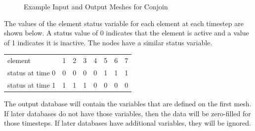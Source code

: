 \begin{figure}[htp]
\caption{Example Input and Output Meshes for Conjoin}
\end{figure}

The values of the element status variable for each element at each
timestep are shown below.  A status value of 0 indicates that the
element is active and a value of 1 indicates it is inactive. The nodes
have a similar status variable.

\begin{tabular}{l|ccccccc}
\hline
   element        & 1 & 2 & 3 & 4 & 5 & 6 & 7 \\
   status at time 0 & 0 & 0 & 0 & 0 & 1 & 1 & 1 \\
   status at time 1 & 1 & 1 & 1 & 0 & 0 & 0 & 0 \\
\hline
\end{tabular}

The output database will contain the variables that are defined on the
first mesh.  If later databases do not have those variables, then the
data will be zero-filled for those timesteps.  If later databases have
additional variables, they will be ignored.

